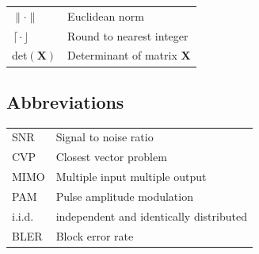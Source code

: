 \documentclass[english,12pt,a4paper,pdftex,sci,utf8]{aaltothesis}
\begin{document}
\begin{tabular}{ll}
$\| \cdot \| $     & Euclidean norm \\
$\left\lceil\cdot\right\rfloor$ & Round to nearest integer \\
det$(\mathbf{X})$  & Determinant of matrix $\mathbf{X}$
\end{tabular}

\subsection*{Abbreviations}

\begin{tabular}{ll}
SNR & Signal to noise ratio \\
CVP & Closest vector problem \\
MIMO & Multiple input multiple output \\
PAM & Pulse amplitude modulation \\
i.i.d. & independent and identically distributed \\
BLER & Block error rate \\
\end{tabular}


\cleardoublepage
\storeinipagenumber
{}
\setcounter{page}{1}


\end{document}
